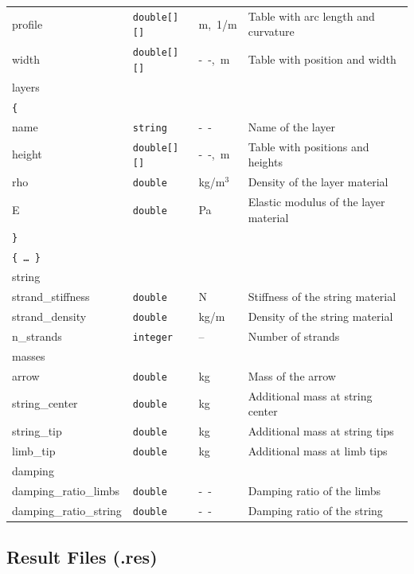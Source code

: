 \documentclass[12pt]{article}
\begin{document}
\begin{table}[H]
{\begin{tabular}{ l | l | l | l }
\tablespace profile & \texttt{double[][]} & \unit[]{m},\ \unit[]{1/m} & Table with arc length and curvature \\
\tablespace width & \texttt{double[][]} & \unit[]{--},\ \unit[]{m} & Table with position and width \\
\tablespace layers & & & \\
\quad \texttt{\{} & & & \\
\quad\quad name & \texttt{string} & \unit[]{--} & Name of the layer \\
\quad\quad height & \texttt{double[][]} & \unit[]{--},\ \unit[]{m} & Table with positions and heights \\
\quad\quad rho & \texttt{double} & \unit[]{kg/m$^3$} & Density of the layer material \\
\quad\quad E & \texttt{double} & \unit[]{Pa} & Elastic modulus of the layer material \\
\quad \texttt{\}} & & & \\
\quad\texttt{\{\ \ldots\ \}} & & & \\
\tablespace string & & & \\
\quad strand\_stiffness & \texttt{double} & \unit[]{N} & Stiffness of the string material\\
\quad strand\_density & \texttt{double} & \unit[]{kg/m} & Density of the string material \\
\quad n\_strands & \texttt{integer} & -- & Number of strands \\
\tablespace masses & & & \\
\quad arrow & \texttt{double} & \unit[]{kg} & Mass of the arrow \\
\quad string\_center & \texttt{double} & \unit[]{kg} & Additional mass at string center \\
\quad string\_tip & \texttt{double} & \unit[]{kg} & Additional mass at string tips \\
\quad limb\_tip & \texttt{double} & \unit[]{kg} & Additional mass at limb tips \\
\tablespace damping & & & \\
\quad damping\_ratio\_limbs & \texttt{double} & \unit[]{--} & Damping ratio of the limbs \\
\quad damping\_ratio\_string & \texttt{double} & \unit[]{--} & Damping ratio of the string
\end{tabular}}
\end{table}

\newpage
\subsection{Result Files (.res)}
\label{sec:output-structure}
\end{document}

